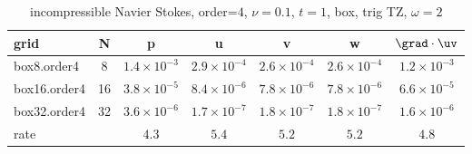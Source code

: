 \begin{table}[hbt]
\begin{center}
\begin{tabular}{|l|c|c|c|c|c|c|} \hline\hline 
grid  & N &  p &  u & v & w & $\grad\cdot\uv$\\ \hline 
         box8.order4 &     8 &  $1.4\times10^{ -3}$  &  $2.9\times10^{ -4}$  &  $2.6\times10^{ -4}$  &  $2.6\times10^{ -4}$  &  $1.2\times10^{ -3}$   \\ \hline
        box16.order4 &    16 &  $3.8\times10^{ -5}$  &  $8.4\times10^{ -6}$  &  $7.8\times10^{ -6}$  &  $7.8\times10^{ -6}$  &  $6.6\times10^{ -5}$   \\ \hline
        box32.order4 &    32 &  $3.6\times10^{ -6}$  &  $1.7\times10^{ -7}$  &  $1.8\times10^{ -7}$  &  $1.8\times10^{ -7}$  &  $1.6\times10^{ -6}$   \\ \hline
    rate            &     &       $4.3$ &       $5.4$ &       $5.2$ &       $5.2$ &       $4.8$  \\ \hline\hline
\end{tabular}
\caption{incompressible Navier Stokes, order=$4$, $\nu=0.1$, $t=1$, box, trig TZ, $\omega=2$}\label{table:ins.box}
\end{center}
\end{table}

